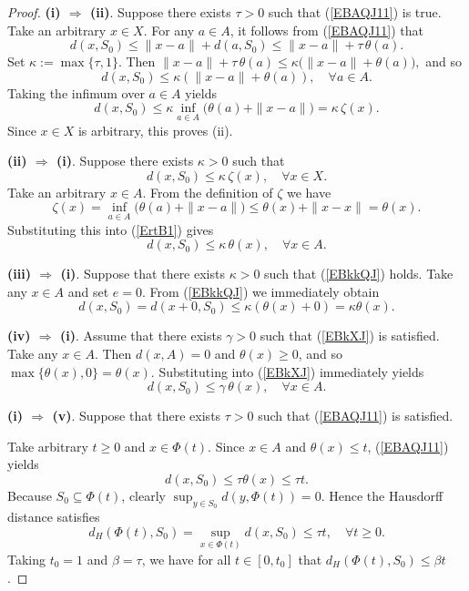 \documentclass[11pt]{article}
\begin{document}
\begin{proof}
	\noindent\textbf{(i) $\Rightarrow$ (ii)}.
	Suppose there exists \(\tau > 0\) such that   (\ref{EBAQJ11}) is true.
	Take an arbitrary \(x \in X\). For any \(a \in A\),   it follows from  (\ref{EBAQJ11})  that
	\[
	d(x, S_0) \le \|x - a\| + d(a, S_0) \le \|x - a\| + \tau \, \theta(a).
	\]
	Set \(\kappa := \max\{\tau, 1\}\). Then  
	$  \|x - a\| + \tau \, \theta(a) \le \kappa \bigl( \|x - a\| + \theta(a) \bigr),$  and so
	$$d(x, S_0) \le \kappa (\|x - a\| + \theta(a)),  \quad  \forall a \in A.  $$
	Taking the infimum over \(a \in A\) yields  
	\[
	d(x, S_0) \le \kappa \inf_{a \in A} \bigl( \theta(a) + \|x - a\| \bigr) = \kappa \, \zeta(x).
	\]
	Since \(x \in X\) is arbitrary, this proves (ii).
	
	
	\noindent\textbf{(ii) $\Rightarrow$ (i)}.
	Suppose there exists \(\kappa > 0\) such that 
	\begin{equation}\label{ErtB1}
		d(x, S_0) \le \kappa \, \zeta(x), \quad  \forall x \in X.
	\end{equation}
	Take an arbitrary \(x \in A\). From the definition of \(\zeta\) we have  
	\[
	\zeta(x) = \inf_{a \in A} \bigl( \theta(a) + \|x - a\| \bigr) \le \theta(x) + \|x - x\| = \theta(x).
	\]
	Substituting this into    (\ref{ErtB1})   gives  
	\[
	d(x, S_0) \le \kappa \, \theta(x), \quad \forall x \in A.
	\]
	
	\noindent\textbf{(iii) $\Rightarrow$ (i)}.
	Suppose  that there exists \(\kappa > 0\) such that  (\ref{EBkkQJ}) holds.   
	Take any \(x \in A\) and set \(e = 0\). From (\ref{EBkkQJ}) we immediately obtain
	\[
	d(x, S_0) = d(x+0, S_0) \le \kappa (\theta(x) + 0) = \kappa \theta(x).
	\]
	
	
	\noindent\textbf{(iv) $\Rightarrow$ (i)}.
	Assume that  there exists $\gamma>0$ such that (\ref{EBkXJ}) is satisfied.
	Take any $x\in A$. Then $d(x, A)=0$  and   $\theta(x)\ge0$, and so $\max\{\theta(x),0\}=\theta(x)$. Substituting into (\ref{EBkXJ}) immediately yields
	\[
	d(x,S_0)\le \gamma\,\theta(x),\quad \forall x\in A.
	\]
	
	
	
	\noindent\textbf{(i) $\Rightarrow$ (v)}.
	Suppose that  there exists \(\tau > 0\) such that   (\ref{EBAQJ11})  is satisfied.
	
	Take arbitrary \(t \ge 0\) and \(x \in \Phi(t)\). Since \(x \in A\) and \(\theta(x) \le t\),   (\ref{EBAQJ11})  yields
	\[
	d(x, S_0) \le \tau \theta(x) \le \tau t.
	\]
	Because \(S_0 \subseteq \Phi(t)\), clearly \(\sup_{y \in S_0} d(y, \Phi(t)) = 0\). Hence the Hausdorff distance satisfies
	\[
	d_H(\Phi(t), S_0) = \sup_{x \in \Phi(t)} d(x, S_0) \le \tau t, \quad \forall t \ge 0.
	\]
	Taking \(t_0 = 1\) and \(\beta = \tau\), we have for all \(t \in [0, t_0]\) that \(d_H(\Phi(t), S_0) \le \beta t\). 	 		
	

\end{proof}
\end{document}
